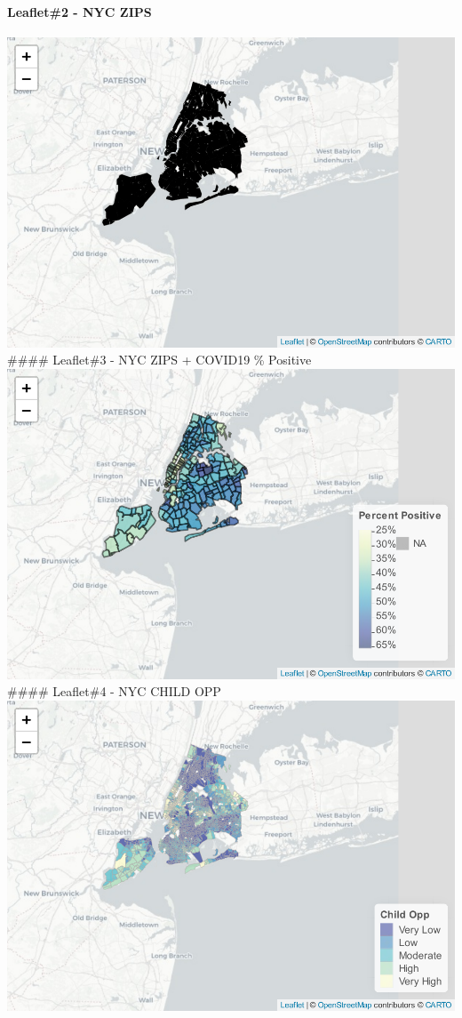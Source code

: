 \documentclass[
]{article}
\begin{document}
\hypertarget{leaflet2---nyc-zips}{%
\paragraph{Leaflet\#2 - NYC ZIPS}\label{leaflet2---nyc-zips}}

\includegraphics{leaflet_files/figure-latex/unnamed-chunk-11-1.pdf}
\#\#\#\# Leaflet\#3 - NYC ZIPS + COVID19 \% Positive
\includegraphics{leaflet_files/figure-latex/unnamed-chunk-12-1.pdf}
\#\#\#\# Leaflet\#4 - NYC CHILD OPP
\includegraphics{leaflet_files/figure-latex/unnamed-chunk-13-1.pdf}
\end{document}
